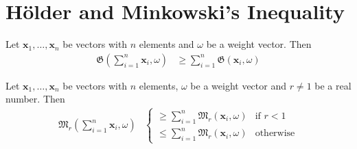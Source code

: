 \documentclass[inequalities.tex]{subfile}
\begin{document}
	
	\section{H\"{o}lder and Minkowski's Inequality}\label{sec:holdmink}
	
		\begin{theorem}\label{thm:holder}
			Let $\mathbf{x}_{1},\ldots,\mathbf{x}_{n}$ be vectors with $n$ elements and $\omega$ be a weight vector. Then
				\begin{align*}
					\mathfrak{G}\left(\sum_{i=1}^{n}\mathbf{x}_{i},\omega\right)
					& \geq \sum_{i=1}^{n}\mathfrak{G}(\mathbf{x}_{i},\omega)
				\end{align*}
		\end{theorem}
	
		\begin{theorem}\label{thm:mink}
			Let $\mathbf{x}_{1},\ldots,\mathbf{x}_{n}$ be vectors with $n$ elements, $\omega$ be a weight vector and $r\neq1$ be a real number. Then
				\begin{align*}
					\mathfrak{M}_{r}\left(\sum_{i=1}^{n}\mathbf{x}_{i},\omega\right)
						&
							\begin{cases}
								\geq \sum_{i=1}^{n}\mathfrak{M}_{r}(\mathbf{x}_{i},\omega)& \mbox{if }r<1\\
								\leq \sum_{i=1}^{n}\mathfrak{M}_{r}(\mathbf{x}_{i}, \omega)& \mbox{otherwise}
							\end{cases}
				\end{align*}
		\end{theorem}
\end{document}
